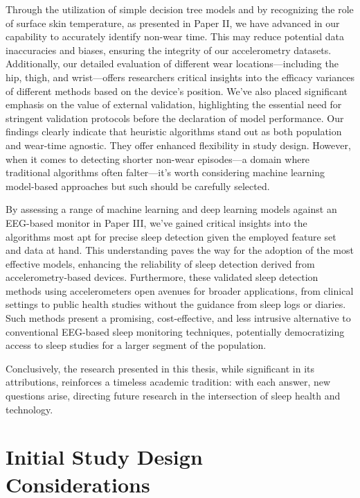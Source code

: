 \documentclass[
  10pt,
]{scrbook}
\begin{document}
Through the utilization of simple decision tree models and by
recognizing the role of surface skin temperature, as presented in Paper
II, we have advanced in our capability to accurately identify non-wear
time. This may reduce potential data inaccuracies and biases, ensuring
the integrity of our accelerometry datasets. Additionally, our detailed
evaluation of different wear locations---including the hip, thigh, and
wrist---offers researchers critical insights into the efficacy variances
of different methods based on the device's position. We've also placed
significant emphasis on the value of external validation, highlighting
the essential need for stringent validation protocols before the
declaration of model performance. Our findings clearly indicate that
heuristic algorithms stand out as both population and wear-time
agnostic. They offer enhanced flexibility in study design. However, when
it comes to detecting shorter non-wear episodes---a domain where
traditional algorithms often falter---it's worth considering machine
learning model-based approaches but such should be carefully selected.

By assessing a range of machine learning and deep learning models
against an EEG-based monitor in Paper III, we've gained critical
insights into the algorithms most apt for precise sleep detection given
the employed feature set and data at hand. This understanding paves the
way for the adoption of the most effective models, enhancing the
reliability of sleep detection derived from accelerometry-based devices.
Furthermore, these validated sleep detection methods using
accelerometers open avenues for broader applications, from clinical
settings to public health studies without the guidance from sleep logs
or diaries. Such methods present a promising, cost-effective, and less
intrusive alternative to conventional EEG-based sleep monitoring
techniques, potentially democratizing access to sleep studies for a
larger segment of the population.

Conclusively, the research presented in this thesis, while significant
in its attributions, reinforces a timeless academic tradition: with each
answer, new questions arise, directing future research in the
intersection of sleep health and technology.

\hypertarget{initial-study-design-considerations}{%
\section{Initial Study Design
Considerations}\label{initial-study-design-considerations}}
\end{document}
